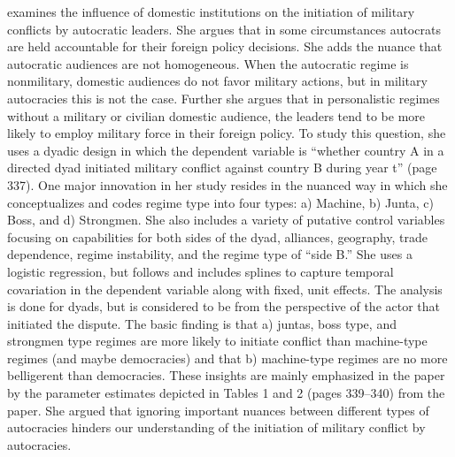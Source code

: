 \documentclass{article}[12pt]
\begin{document}
\citet{weeks:2012} examines the influence of domestic institutions on
the initiation of military conflicts by autocratic leaders.  She
argues that in some circumstances autocrats are held accountable for
their foreign policy decisions. She adds the nuance that autocratic
audiences are not homogeneous. When the autocratic regime is
nonmilitary, domestic audiences do not favor military actions, but in
military autocracies this is not the case. Further she argues that in
personalistic regimes without a military or civilian domestic
audience, the leaders tend to be more likely to employ military force
in their foreign policy.  To study this question, she uses a dyadic
design in which the dependent variable is ``whether country A in a
directed dyad initiated military conflict against country B during
year t'' (page 337).  One major innovation in her study resides in the
nuanced way in which she conceptualizes and codes regime type into
four types: a) Machine, b) Junta, c) Boss, and d) Strongmen. She also
includes a variety of putative control variables focusing on
capabilities for both sides of the dyad, alliances, geography, trade
dependence, regime instability, and the regime type of ``side B.''
She uses a logistic regression, but follows \citet{beck:etal:1998} and
includes splines to capture temporal covariation in the dependent
variable along with fixed, unit effects. The analysis is done for
dyads, but is considered to be from the perspective of the actor that
initiated the dispute. The basic finding is that a) juntas, boss type,
and strongmen type regimes are more likely to initiate conflict than
machine-type regimes (and maybe democracies) and that b) machine-type
regimes are no more belligerent than democracies.  
These insights are mainly emphasized in the paper by the parameter
estimates depicted in Tables 1 and 2 (pages 339--340) from the
paper. She argued that ignoring important nuances between
different types of autocracies hinders our understanding of the
initiation of military conflict by autocracies. 
\end{document}
